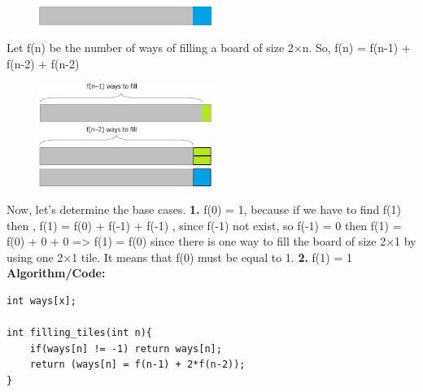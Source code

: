 \documentclass[12pt]{article}
\begin{document}
{\begin{figure}[H]
\centering
\includegraphics[width=0.5\textwidth]{f1_2x2.png}
\end{figure}
 Let f(n) be the number of ways of filling a board of size 2×n.
\newline
So,  f(n) = f(n-1) + f(n-2) + f(n-2)
\begin{figure}[H]
\centering
\includegraphics[width=0.5\textwidth]{f1_ways.png}
\includegraphics[width=0.5\textwidth]{fn_2ways.png}
\end{figure}
 Now, let's determine the base cases.\newline
\textbf{1.}   f(0) = 1, because if we have to find f(1) then , f(1) = f(0) + f(-1) + f(-1) , since f(-1) not exist, so  f(-1) = 0 then f(1) = f(0) + 0 + 0 => f(1) = f(0) 
since there is one way to fill the board of size 2×1 by using one 2×1 tile. It means that f(0) must 
be equal to 1.
\newline
\textbf{2.}   f(1) = 1
\vspace{6mm}
\newline
\textbf{Algorithm/Code: }
\begin{lstlisting}
int ways[x];

int filling_tiles(int n){
	if(ways[n] != -1) return ways[n];
	return (ways[n] = f(n-1) + 2*f(n-2));
}



\end{lstlisting}}
\end{document}
